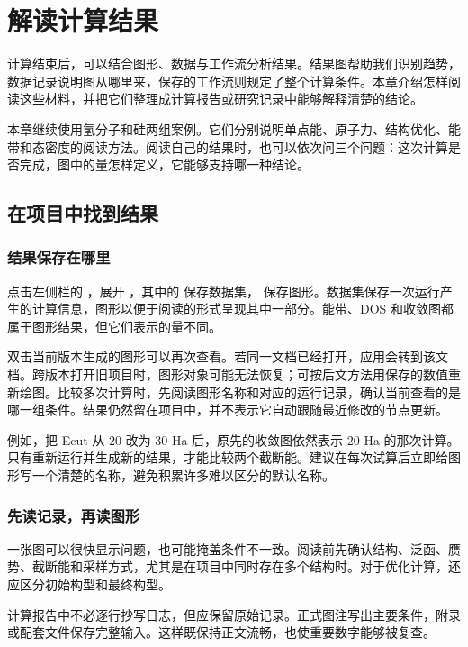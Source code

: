 \chapter{解读计算结果}\label{ch:results}

计算结束后，可以结合图形、数据与工作流分析结果。结果图帮助我们识别趋势，数据记录说明图从哪里来，保存的工作流则规定了整个计算条件。本章介绍怎样阅读这些材料，并把它们整理成计算报告或研究记录中能够解释清楚的结论。

本章继续使用氢分子和硅两组案例。它们分别说明单点能、原子力、结构优化、能带和态密度的阅读方法。阅读自己的结果时，也可以依次问三个问题：这次计算是否完成，图中的量怎样定义，它能够支持哪一种结论。

\section{在项目中找到结果}

\subsection{结果保存在哪里}

点击左侧栏的 ，展开 ，其中的  保存数据集， 保存图形。数据集保存一次运行产生的计算信息，图形以便于阅读的形式呈现其中一部分。能带、DOS 和收敛图都属于图形结果，但它们表示的量不同。

双击当前版本生成的图形可以再次查看。若同一文档已经打开，应用会转到该文档。跨版本打开旧项目时，图形对象可能无法恢复；可按后文方法用保存的数值重新绘图。比较多次计算时，先阅读图形名称和对应的运行记录，确认当前查看的是哪一组条件。结果仍然留在项目中，并不表示它自动跟随最近修改的节点更新。

例如，把 Ecut 从 $20$ 改为 $30$ Ha 后，原先的收敛图依然表示 $20$ Ha 的那次计算。只有重新运行并生成新的结果，才能比较两个截断能。建议在每次试算后立即给图形写一个清楚的名称，避免积累许多难以区分的默认名称。

\subsection{先读记录，再读图形}

一张图可以很快显示问题，也可能掩盖条件不一致。阅读前先确认结构、泛函、赝势、截断能和采样方式，尤其是在项目中同时存在多个结构时。对于优化计算，还应区分初始构型和最终构型。

计算报告中不必逐行抄写日志，但应保留原始记录。正式图注写出主要条件，附录或配套文件保存完整输入。这样既保持正文流畅，也使重要数字能够被复查。

